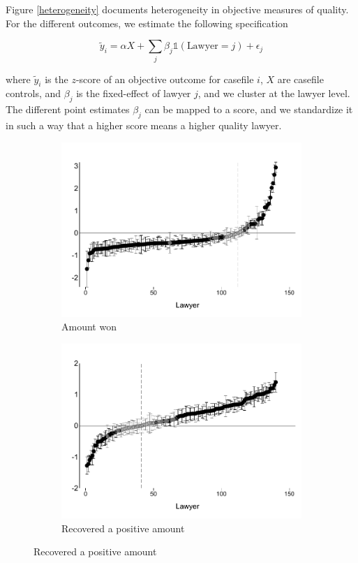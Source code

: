 \documentclass[oneside,11pt]{article}
\begin{document}
Figure \ref{heterogeneity} documents heterogeneity in objective measures of quality. For the different outcomes, we estimate the following specification

\[ \widetilde{y}_i = \alpha X + \sum_j\beta_j\mathds{1}(\text{Lawyer} = j) + \epsilon_j\]

where $\widetilde{y}_i$ is the $z$-score of an objective outcome for casefile $i$, $X$ are casefile controls, and $\beta_j$ is the fixed-effect of lawyer $j$, and we cluster at the lawyer level. The different point estimates $\beta_j$ can be mapped to a score, and we standardize it in such a way that a higher score means a higher quality lawyer. 


\begin{figure}[H] 
    \label{heterogeneity}
    \caption{Lawyer quality heterogeneity (objective)}
     \begin{center}
    \begin{subfigure}{0.49\textwidth}
        \caption{Amount won}
        \centering
        \includegraphics[width=\textwidth]{Figuras/betas_ql_liq_total.pdf}
    \end{subfigure}
    \begin{subfigure}{0.49\textwidth}
        \caption{Recovered a positive amount}
        \centering
        \includegraphics[width=\textwidth]{Figuras/betas_ql_pos_rec.pdf}

\end{subfigure}
\end{center}
\end{figure}
\end{document}
